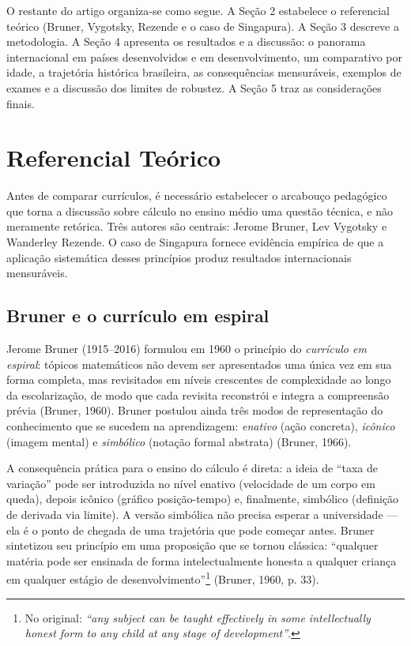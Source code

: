 \documentclass[12pt,a4paper,oneside]{article}
\begin{document}
O restante do artigo organiza-se como segue. A Seção 2 estabelece o
referencial teórico (Bruner, Vygotsky, Rezende e o caso de Singapura). A
Seção 3 descreve a metodologia. A Seção 4 apresenta os resultados e a
discussão: o panorama internacional em países desenvolvidos e em
desenvolvimento, um comparativo por idade, a trajetória histórica
brasileira, as consequências mensuráveis, exemplos de exames e a
discussão dos limites de robustez. A Seção 5 traz as considerações
finais.

\section{Referencial Teórico}

Antes de comparar currículos, é necessário estabelecer o arcabouço
pedagógico que torna a discussão sobre cálculo no ensino médio uma
questão técnica, e não meramente retórica. Três autores são centrais:
Jerome Bruner, Lev Vygotsky e Wanderley Rezende. O caso de Singapura
fornece evidência empírica de que a aplicação sistemática desses
princípios produz resultados internacionais mensuráveis.

\subsection{Bruner e o currículo em espiral}

Jerome Bruner (1915--2016) formulou em 1960 o princípio do \emph{currículo
em espiral}: tópicos matemáticos não devem ser apresentados uma única vez
em sua forma completa, mas revisitados em níveis crescentes de
complexidade ao longo da escolarização, de modo que cada revisita
reconstrói e integra a compreensão prévia (Bruner, 1960). Bruner postulou
ainda três modos de representação do conhecimento que se sucedem na
aprendizagem: \emph{enativo} (ação concreta), \emph{icônico} (imagem
mental) e \emph{simbólico} (notação formal abstrata) (Bruner, 1966).

A consequência prática para o ensino do cálculo é direta: a ideia de
``taxa de variação'' pode ser introduzida no nível enativo (velocidade de
um corpo em queda), depois icônico (gráfico posição-tempo) e, finalmente,
simbólico (definição de derivada via limite). A versão simbólica não
precisa esperar a universidade --- ela é o ponto de chegada de uma
trajetória que pode começar antes. Bruner sintetizou seu princípio em
uma proposição que se tornou clássica: ``qualquer matéria pode ser
ensinada de forma intelectualmente honesta a qualquer criança em qualquer
estágio de desenvolvimento''\footnote{No original: \emph{``any subject
can be taught effectively in some intellectually honest form to any child
at any stage of development''}.} (Bruner, 1960, p. 33).
\end{document}
